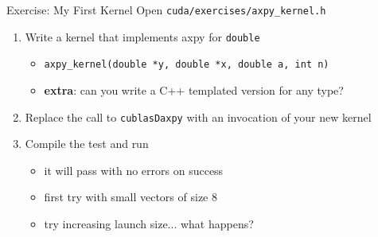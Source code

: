 \documentclass[aspectratio=43]{beamer}
\newcommand{\axpy}{{\ttfamily axpy}\xspace}
\newcommand{\extra}{{\bfseries extra}:\xspace}
\newcommand{\lst}[1]{\colorbox{white!90!blue}{\lstinline!#1!}}
\begin{document}
\begin{frame}[fragile]{Exercise: My First Kernel}
    Open \lst{cuda/exercises/axpy_kernel.h}

    \begin{enumerate}
        \item Write a kernel that implements \axpy for \lst{double}
        \begin{itemize}
            \item \lst{axpy_kernel(double *y, double *x, double a, int n)}
            \item \extra can you write a C++ templated version for any type?
        \end{itemize}

        \item Replace the call to \lst{cublasDaxpy} with an invocation of your new kernel
        \item Compile the test and run
        \begin{itemize}
            \item it will pass with no errors on success
            \item first try with small vectors of size 8
            \item try increasing launch size... what happens?
        \end{itemize}
    \end{enumerate}
\end{frame}
\end{document}

